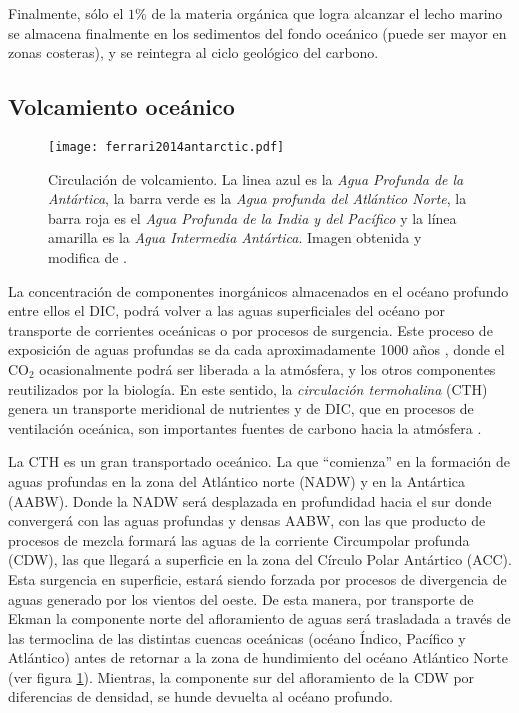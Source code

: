 Finalmente, sólo el $1\%$  \citep{gruber2008marine} de la materia orgánica que logra alcanzar el lecho marino se almacena finalmente en los sedimentos del fondo oceánico (puede ser mayor en zonas costeras), y se reintegra al ciclo geológico del carbono. \newpage

\subsection{Volcamiento oceánico}

\begin{figure}[H]
\centering
 \texttt{[image: ferrari2014antarctic.pdf]}
 \caption[Circulación de volcamiento]{Circulación de volcamiento. La linea azul es la \textit{Agua Profunda de la Antártica}, la barra verde es la \textit{Agua profunda del Atlántico Norte}, la barra roja es el \textit{Agua Profunda de la India y del Pacífico} y la línea amarilla es la \textit{Agua Intermedia Antártica}. Imagen obtenida y modifica de \cite{ferrari2014antarctic}.}
  \label{fig:circ}
\end{figure}

La concentración de componentes inorgánicos almacenados en el océano profundo entre ellos el DIC, podrá volver a las aguas superficiales del océano por transporte de corrientes oceánicas o por procesos de surgencia. Este proceso de exposición de aguas profundas se da cada aproximadamente 1000 años \citep{sigman2000glacial}, donde el CO$_2$ ocasionalmente podr\'a ser liberada a la atm\'osfera, y los otros componentes reutilizados por la biolog\'ia. En este sentido, la \textit{circulación termohalina} (CTH) genera un transporte meridional de nutrientes y de DIC, que en procesos de ventilación oceánica, son importantes fuentes de carbono hacia la atmósfera \citep{toggweiler2006midlatitude}.  

La CTH es un gran transportado oceánico. La que ``comienza'' en la formación de aguas profundas en la zona del Atlántico norte (NADW) y en la Ant\'artica (AABW). Donde la NADW ser\'a desplazada en profundidad hacia el sur donde converger\'a con las aguas profundas y densas AABW, con las que producto de procesos de mezcla formará las aguas de la corriente Circumpolar profunda (CDW), las que llegará a superficie en la zona del Círculo Polar Antártico (ACC). Esta surgencia en superficie, estará siendo forzada por procesos de divergencia de aguas generado por los vientos del oeste. De esta manera, por transporte de Ekman la componente norte del afloramiento de aguas será trasladada a través de las termoclina de las distintas cuencas oceánicas (océano Índico, Pacífico y Atlántico) antes de retornar a la zona de hundimiento del océano Atlántico Norte (ver figura \ref{fig:circ}). Mientras, la componente sur del afloramiento de la CDW por diferencias de densidad, se hunde devuelta al océano profundo. 


